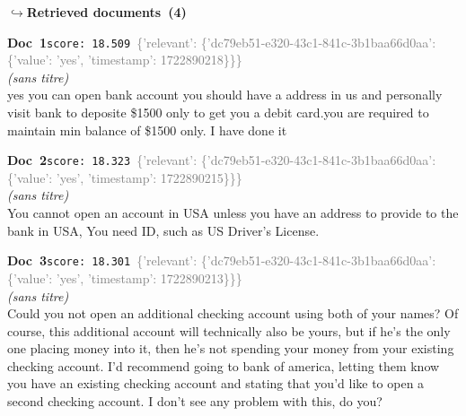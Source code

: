 \documentclass[a4paper,11pt]{article}
\begin{document}
\noindent\hfill{\footnotesize\textcolor{doccolor}{\textbf{$\hookrightarrow$\enspace Retrieved documents~(4)}}}
\begin{docenv}
{\footnotesize\textcolor{doccolor}{\textbf{Doc~1}}}\hfill{\tiny\texttt{score:~18.509}}\ {\tiny\textcolor{gray}{\{'relevant': \{'dc79eb51-e320-43c1-841c-3b1baa66d0aa': \{'value': 'yes', 'timestamp': 1722890218\}\}\}}}\\[3pt]
{\small\textit{(sans titre)}}\\[2pt]
\vspace{2pt}
{\footnotesize 
yes you can open bank account you should have a address in us and personally visit bank to deposite \$1500 only to get you a debit card.you are required to maintain min balance of \$1500 only. I have done it}
\end{docenv}
\begin{docenv}
{\footnotesize\textcolor{doccolor}{\textbf{Doc~2}}}\hfill{\tiny\texttt{score:~18.323}}\ {\tiny\textcolor{gray}{\{'relevant': \{'dc79eb51-e320-43c1-841c-3b1baa66d0aa': \{'value': 'yes', 'timestamp': 1722890215\}\}\}}}\\[3pt]
{\small\textit{(sans titre)}}\\[2pt]
\vspace{2pt}
{\footnotesize 
You cannot open an account in USA unless you have an address to provide to the bank in USA, You need ID, such as US Driver's License.}
\end{docenv}
\begin{docenv}
{\footnotesize\textcolor{doccolor}{\textbf{Doc~3}}}\hfill{\tiny\texttt{score:~18.301}}\ {\tiny\textcolor{gray}{\{'relevant': \{'dc79eb51-e320-43c1-841c-3b1baa66d0aa': \{'value': 'yes', 'timestamp': 1722890213\}\}\}}}\\[3pt]
{\small\textit{(sans titre)}}\\[2pt]
\vspace{2pt}
{\footnotesize 
Could you not open an additional checking account using both of your names? Of course, this additional account will technically also be yours, but if he's the only one placing money into it, then he's not spending your money from your existing checking account. I'd recommend going to bank of america, letting them know you have an existing checking account and stating that you'd like to open a second checking account.  I don't see any problem with this, do you?}
\end{docenv}
\end{document}
